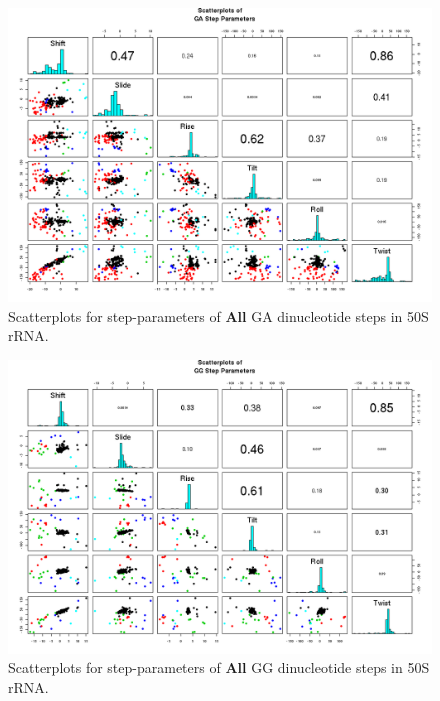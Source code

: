 \begin{figure}[H]
\centering
\includegraphics[angle=90, scale=0.6]{All/GA.png}
\caption{Scatterplots for step-parameters of \textbf{All} GA dinucleotide steps
in 50S rRNA.}
\label{fig:stepsGA}
\end{figure}

\begin{figure}[H]
\centering
\includegraphics[angle=90, scale=0.6]{All/GG.png}
\caption{Scatterplots for step-parameters of \textbf{All} GG dinucleotide steps
in 50S rRNA.}
\label{fig:stepsGG}
\end{figure}

